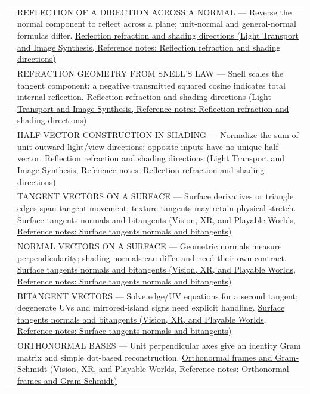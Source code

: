 {\begin{longtable}[]{@{}
  >{\raggedright\arraybackslash}p{}
  >{\raggedright\arraybackslash}p{}@{}}
553 & REFLECTION OF A DIRECTION ACROSS A NORMAL --- Reverse the normal component to reflect across a plane; unit-normal and general-normal formulas differ. \href{../04-Light-Transport-and-Image-Synthesis/main.pdf\#nameddest=appendix-44e00863b4d5}{Reflection refraction and shading directions (Light Transport and Image Synthesis, Reference notes: Reflection refraction and shading directions)} \\
554 & REFRACTION GEOMETRY FROM SNELL'S LAW --- Snell scales the tangent component; a negative transmitted squared cosine indicates total internal reflection. \href{../04-Light-Transport-and-Image-Synthesis/main.pdf\#nameddest=appendix-44e00863b4d5}{Reflection refraction and shading directions (Light Transport and Image Synthesis, Reference notes: Reflection refraction and shading directions)} \\
555 & HALF-VECTOR CONSTRUCTION IN SHADING --- Normalize the sum of unit outward light/view directions; opposite inputs have no unique half-vector. \href{../04-Light-Transport-and-Image-Synthesis/main.pdf\#nameddest=appendix-44e00863b4d5}{Reflection refraction and shading directions (Light Transport and Image Synthesis, Reference notes: Reflection refraction and shading directions)} \\
556 & TANGENT VECTORS ON A SURFACE --- Surface derivatives or triangle edges span tangent movement; texture tangents may retain physical stretch. \href{../07-Vision-XR-and-Playable-Worlds/main.pdf\#nameddest=appendix-e31893dec985}{Surface tangents normals and bitangents (Vision, XR, and Playable Worlds, Reference notes: Surface tangents normals and bitangents)} \\
557 & NORMAL VECTORS ON A SURFACE --- Geometric normals measure perpendicularity; shading normals can differ and need their own contract. \href{../07-Vision-XR-and-Playable-Worlds/main.pdf\#nameddest=appendix-e31893dec985}{Surface tangents normals and bitangents (Vision, XR, and Playable Worlds, Reference notes: Surface tangents normals and bitangents)} \\
558 & BITANGENT VECTORS --- Solve edge/UV equations for a second tangent; degenerate UVs and mirrored-island signs need explicit handling. \href{../07-Vision-XR-and-Playable-Worlds/main.pdf\#nameddest=appendix-e31893dec985}{Surface tangents normals and bitangents (Vision, XR, and Playable Worlds, Reference notes: Surface tangents normals and bitangents)} \\
559 & ORTHONORMAL BASES --- Unit perpendicular axes give an identity Gram matrix and simple dot-based reconstruction. \href{../07-Vision-XR-and-Playable-Worlds/main.pdf\#nameddest=appendix-c39f1ed34271}{Orthonormal frames and Gram-Schmidt (Vision, XR, and Playable Worlds, Reference notes: Orthonormal frames and Gram-Schmidt)} \\

\end{longtable}}
